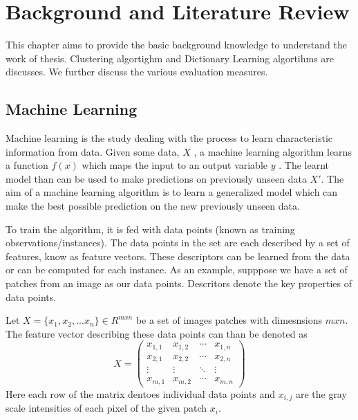 
\chapter{Background and Literature Review}

\ifpdf
    \graphicspath{{Chapter2/Figs/Raster/}{Chapter2/Figs/PDF/}{Chapter2/Figs/}}
\else
    \graphicspath{{Chapter2/Figs/Vector/}{Chapter2/Figs/}}
\fi

This chapter aims to provide the basic background knowledge to understand the work of thesis. Clustering algortighm and Dictionary Learning algortihms are discusses. We further discuss the various evaluation measures.
\section[Machine Learning]{Machine Learning}

Machine learning is the study dealing with the process to learn characteristic information from data. Given some data, $ X $ , a machine learning algorithm learns a function $ f(x) $ which maps the input to an output variable $y$ . The learnt model than can be used to make predictions on previously unseen data $X'$. The aim of a machine learning algorithm is to learn a generalized model which can make the best possible prediction on the new previously unseen data.

To train the algorithm, it is fed with data points (known as training observations/instances). The data points in the set are each described by a set of features, know as feature vectors. These descriptors can be learned from the data or can be computed for each instance. As an example, supppose we have a set of patches from an image as our data points. Descritors denote the key properties of data points.

Let $X =\{x_1,x_2,... x_n\} \in R^{m x n}$ be a set of images patches with dimesnsions ${m x n}$. The feature vector describing these data points can than be denoted as
\begin{equation*}
X = \begin{pmatrix}
x_{1,1} & x_{1,2} & \cdots & x_{1,n} \\
x_{2,1} & x_{2,2} & \cdots & x_{2,n} \\
\vdots  & \vdots  & \ddots & \vdots  \\
x_{m,1} & x_{m,2} & \cdots & x_{m,n}
\end{pmatrix}
\end{equation*}
Here each row of the matrix dentoes individual data points and ${x_{i,j}}$ are the gray scale intensities of each pixel of the given patch $x_i$.





